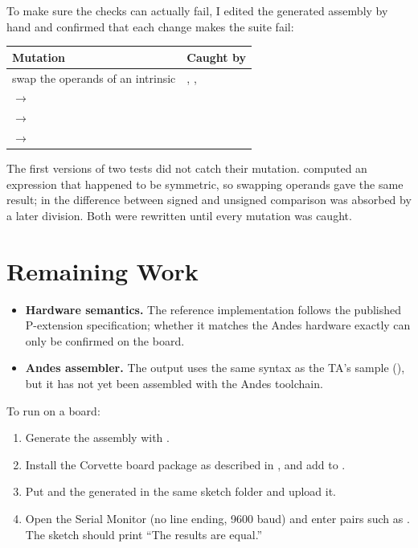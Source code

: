 \documentclass[12pt]{article}
\begin{document}
To make sure the checks can actually fail, I edited the generated assembly by hand and confirmed that each
change makes the suite fail:

\begin{center}
\begin{tabularx}{\linewidth}{@{}lL@{}}
\toprule
Mutation & Caught by \\
\midrule
swap the operands of an intrinsic & , ,  \\
 $\rightarrow$  &  \\
 $\rightarrow$  &  \\
 $\rightarrow$  &  \\
\bottomrule
\end{tabularx}
\end{center}

The first versions of two tests did not catch their mutation.  computed an expression that happened
to be symmetric, so swapping operands gave the same result; in  the difference between signed and
unsigned comparison was absorbed by a later division. Both were rewritten until every mutation was caught.

\section{Remaining Work}

\begin{itemize}
  \item \textbf{Hardware semantics.} The reference implementation follows the published P-extension
        specification; whether it matches the Andes hardware exactly can only be confirmed on the board.
  \item \textbf{Andes assembler.} The output uses the same syntax as the TA's sample (),
        but it has not yet been assembled with the Andes toolchain.
\end{itemize}

To run on a board:

\begin{enumerate}
  \item Generate the assembly with .
  \item Install the Corvette board package as described in ,
        and add  to .
  \item Put  and the generated  in the same sketch folder and upload it.
  \item Open the Serial Monitor (no line ending, 9600 baud) and enter pairs such as .
        The sketch should print ``The results are equal.''
\end{enumerate}
\end{document}

